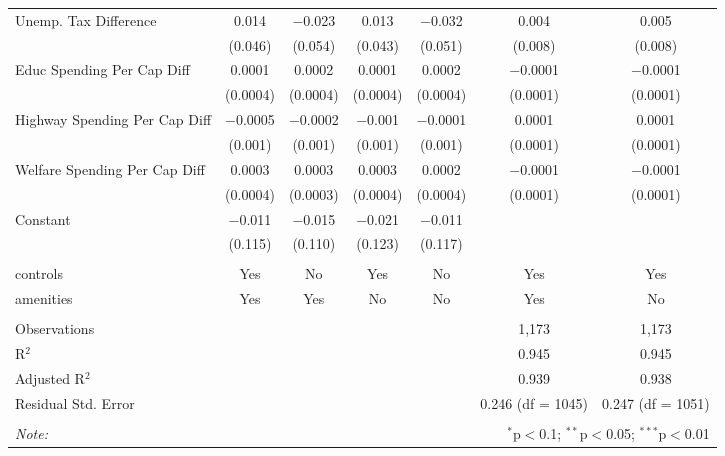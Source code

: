 \begin{table}[!htbp]
\begin{tabular}{@{\extracolsep{5pt}}lcccccc}
  Unemp. Tax Difference & 0.014 & $-$0.023 & 0.013 & $-$0.032 & 0.004 & 0.005 \\ 
  & (0.046) & (0.054) & (0.043) & (0.051) & (0.008) & (0.008) \\ 
  Educ Spending Per Cap Diff & 0.0001 & 0.0002 & 0.0001 & 0.0002 & $-$0.0001 & $-$0.0001 \\ 
  & (0.0004) & (0.0004) & (0.0004) & (0.0004) & (0.0001) & (0.0001) \\ 
  Highway Spending Per Cap Diff & $-$0.0005 & $-$0.0002 & $-$0.001 & $-$0.0001 & 0.0001 & 0.0001 \\ 
  & (0.001) & (0.001) & (0.001) & (0.001) & (0.0001) & (0.0001) \\ 
  Welfare Spending Per Cap Diff & 0.0003 & 0.0003 & 0.0003 & 0.0002 & $-$0.0001 & $-$0.0001 \\ 
  & (0.0004) & (0.0003) & (0.0004) & (0.0004) & (0.0001) & (0.0001) \\ 
  Constant & $-$0.011 & $-$0.015 & $-$0.021 & $-$0.011 &  &  \\ 
  & (0.115) & (0.110) & (0.123) & (0.117) &  &  \\ 
 \hline \\[-1.8ex] 
controls & Yes & No & Yes & No & Yes & Yes \\ 
amenities & Yes & Yes & No & No & Yes & No \\ 
\hline \\[-1.8ex] 
Observations &  &  &  &  & 1,173 & 1,173 \\ 
R$^{2}$ &  &  &  &  & 0.945 & 0.945 \\ 
Adjusted R$^{2}$ &  &  &  &  & 0.939 & 0.938 \\ 
Residual Std. Error &  &  &  &  & 0.246 (df = 1045) & 0.247 (df = 1051) \\ 
\hline 
\hline \\[-1.8ex] 
\textit{Note:}  & \multicolumn{6}{r}{$^{*}$p$<$0.1; $^{**}$p$<$0.05; $^{***}$p$<$0.01} \\ 
\end{tabular} 
\end{table} 

